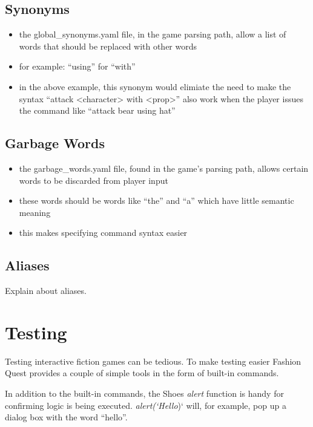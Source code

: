 \documentclass[letterpaper,10pt,english]{manual}
\begin{document}
\subsection{Synonyms}
\begin{itemize}
\item {} 
the global\_synonyms.yaml file, in the game parsing path, allow a list of words that should be replaced with other words

\item {} 
for example: ``using'' for ``with''

\item {} 
in the above example, this synonym would elimiate the need to make the syntax ``attack \textless{}character\textgreater{} with \textless{}prop\textgreater{}'' also work when the player issues the command like ``attack bear using hat''

\end{itemize}


\subsection{Garbage Words}
\begin{itemize}
\item {} 
the garbage\_words.yaml file, found in the game's parsing path, allows certain words to be discarded from player input

\item {} 
these words should be words like ``the'' and ``a'' which have little semantic meaning

\item {} 
this makes specifying command syntax easier

\end{itemize}


\subsection{Aliases}

Explain about aliases.


\section{Testing}

Testing interactive fiction games can be tedious. To make testing easier Fashion Quest provides a couple of simple tools in the form of built-in commands.

In addition to the built-in commands, the Shoes \emph{alert} function is handy for confirming logic is being executed. \emph{alert(`Hello}){}` will, for example, pop up a dialog box with the word ``hello''.
\end{document}
